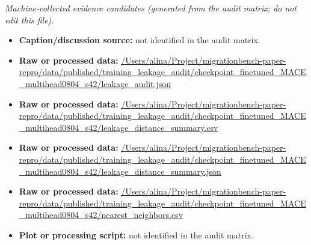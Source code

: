 \emph{Machine-collected evidence candidates (generated from the audit matrix; do not edit this file).}
\begin{itemize}[leftmargin=1.4em,noitemsep]
\item \textbf{Caption/discussion source:} not identified in the audit matrix.
\item \textbf{Raw or processed data:} \url{/Users/alina/Project/migrationbench-paper-repro/data/published/training_leakage_audit/checkpoint_finetuned_MACE_multihead0804_s42/leakage_audit.json}
\item \textbf{Raw or processed data:} \url{/Users/alina/Project/migrationbench-paper-repro/data/published/training_leakage_audit/checkpoint_finetuned_MACE_multihead0804_s42/leakage_distance_summary.csv}
\item \textbf{Raw or processed data:} \url{/Users/alina/Project/migrationbench-paper-repro/data/published/training_leakage_audit/checkpoint_finetuned_MACE_multihead0804_s42/leakage_distance_summary.json}
\item \textbf{Raw or processed data:} \url{/Users/alina/Project/migrationbench-paper-repro/data/published/training_leakage_audit/checkpoint_finetuned_MACE_multihead0804_s42/nearest_neighbors.csv}
\item \textbf{Plot or processing script:} not identified in the audit matrix.
\end{itemize}

